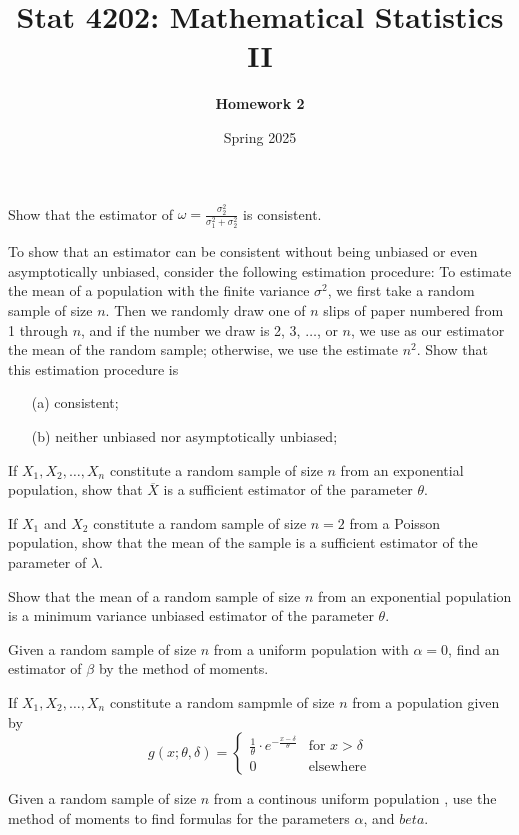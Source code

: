 \documentclass[11pt]{article}
\title{Stat 4202: Mathematical Statistics II}
\author{\textbf{Homework 2}}
\date{Spring 2025}
\begin{document}
\maketitle
\begin{question}
    Show that the estimator of \(\omega = \frac{\sigma_2^2}{\sigma_1^2 + \sigma_2^2}\) is consistent.
\end{question}

\begin{question}
    To show that an estimator can be consistent without being unbiased or even asymptotically unbiased, consider the following estimation procedure: To estimate the mean of a population with the finite variance $\sigma^2$, we first take a random sample of size $n$. Then we randomly draw one of $n$ slips of paper numbered from 1 through $n$, and if the number we draw is 2, 3, \(\ldots\), or $n$, we use as our estimator the mean of the random sample; otherwise, we use the estimate $n^2$. Show that this estimation procedure is
    \begin{itemize}
        \item [(a)] consistent;
        \item [(b)] neither unbiased nor asymptotically unbiased;
    \end{itemize}
\end{question}
\begin{question}
    If $X_1, X_2, \ldots, X_n$ constitute a random sample of size $n$ from an exponential population, show that $\overline{X}$ is a sufficient estimator of the parameter $\theta$.
\end{question}
\begin{question}
    If \(X_1\) and \(X_2\) constitute a random sample of size \(n = 2\) from a Poisson population, show that the mean of the sample is a sufficient estimator of the parameter of \(\lambda\).
\end{question}
\begin{question}
    Show that the mean of a random sample of size \(n\) from an exponential population is a minimum variance unbiased estimator of the parameter \(\theta\).
\end{question}
\begin{question}
    Given a random sample of size \(n\) from a uniform population with \(\alpha = 0\), find an estimator of \(\beta\) by the method of moments.
\end{question}
\begin{question}
    If \(X_1, X_2, \ldots, X_n\) constitute a random sampmle of size \(n\) from a population given by 
    \[
g(x; \theta, \delta) = \begin{cases}
\frac{1}{\theta} \cdot e^{-\frac{x - \delta}{\theta}} & \text{for } x > \delta \\
0 & \text{elsewhere}
\end{cases}
\]
\end{question}

\begin{question}
    Given a random sample of size \(n\) from a continous uniform population , use the method of moments to find formulas for the parameters \(\alpha\), and \(beta\).
\end{question}
\end{document}
